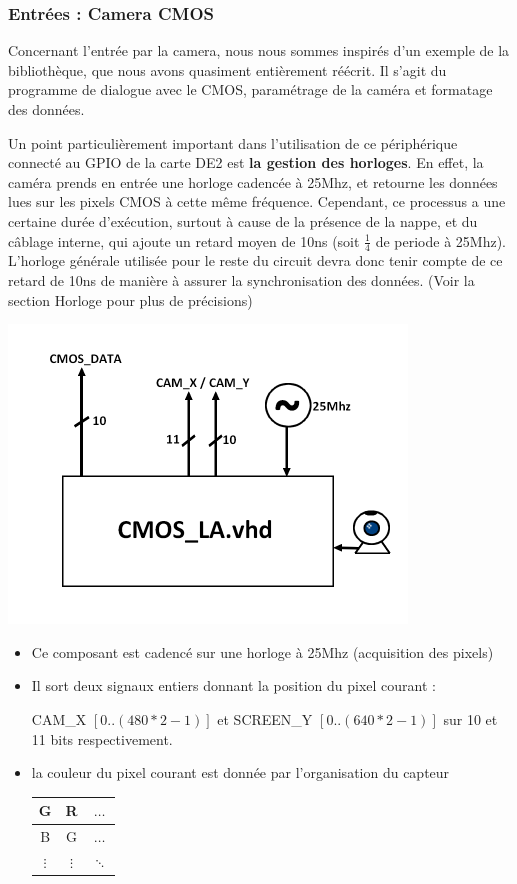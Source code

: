 \documentclass[10pt,a4paper]{article}
\begin{document}
\subsubsection{Entrées : Camera CMOS}
Concernant l'entrée par la camera, nous nous sommes inspirés d'un exemple de la bibliothèque, que nous avons quasiment entièrement réécrit. Il s'agit du programme de dialogue avec le CMOS, paramétrage de la caméra et formatage des données.

Un point particulièrement important dans l'utilisation de ce périphérique connecté au GPIO de la carte DE2 est \textbf{la gestion des horloges}. En effet, la caméra prends en entrée une horloge cadencée à 25Mhz, et retourne les données lues sur les pixels CMOS à cette même fréquence. Cependant, ce processus a une certaine durée d'exécution, surtout à cause de la présence de la nappe, et du câblage interne, qui ajoute un retard moyen de 10ns (soit $\frac{1}{4}$ de periode à 25Mhz). L'horloge générale utilisée pour le reste du circuit devra donc tenir compte de ce retard de 10ns de manière à assurer la synchronisation des données. (Voir la section Horloge pour plus de précisions)

\includegraphics[width=300pt]{gfx/cmos_la.png}
\begin{itemize}
\item Ce composant est cadencé sur une horloge à 25Mhz (acquisition des pixels)
\item Il sort deux signaux entiers donnant la position du pixel courant :

CAM\_X $\left[ 0 .. (480*2-1) \right]$ et SCREEN\_Y $\left[ 0 .. (640*2-1) \right]$ sur 10 et 11 bits respectivement.
\item la couleur du pixel courant est donnée par l'organisation du capteur

\begin{center}
\begin{tabular}{|c|c|c|}
\hline 
G & R & $\ldots$ \\ 
\hline 
B & G & $\ldots$ \\ 
\hline 
$\vdots$ & $\vdots$ & $\ddots$  \\ 
\hline 
\end{tabular} 
\end{center}

\end{itemize}
\end{document}
